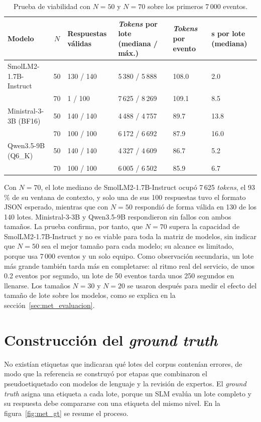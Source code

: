 \begin{table}[H]
\centering
\caption{Prueba de viabilidad con $N = 50$ y $N = 70$ sobre los primeros 7\,000 eventos.}
\label{tab:met_n70}
\small
\begin{tabular}{@{}p{3.3cm}cp{1.8cm}p{2.6cm}p{1.6cm}p{1.6cm}@{}}
\toprule
\textbf{Modelo} & $N$ & \textbf{Respuestas válidas} & \textbf{\textit{Tokens} por lote (mediana / máx.)} & \textbf{\textit{Tokens} por evento} & \textbf{s por lote (mediana)} \\
\midrule
SmolLM2-1.7B-Instruct & 50 & 130 / 140 & 5\,380 / 5\,888 & 108.0 & 2.0 \\
 & 70 & 1 / 100 & 7\,625 / 8\,269 & 109.1 & 8.5 \\
Ministral-3-3B (BF16) & 50 & 140 / 140 & 4\,488 / 4\,757 & 89.7 & 13.8 \\
 & 70 & 100 / 100 & 6\,172 / 6\,692 & 87.9 & 16.0 \\
Qwen3.5-9B (Q6\_K) & 50 & 140 / 140 & 4\,327 / 4\,609 & 86.7 & 5.2 \\
 & 70 & 100 / 100 & 6\,005 / 6\,502 & 85.9 & 6.7 \\
\bottomrule
\end{tabular}
\normalsize
\end{table}

Con $N = 70$, el lote mediano de SmolLM2-1.7B-Instruct ocupó 7\,625 \textit{tokens}, el 93\,\% de su ventana de contexto, y solo una de sus 100 respuestas tuvo el formato JSON esperado, mientras que con $N = 50$ respondió de forma válida en 130 de los 140 lotes. Ministral-3-3B y Qwen3.5-9B respondieron sin fallos con ambos tamaños. La prueba confirma, por tanto, que $N = 70$ supera la capacidad de SmolLM2-1.7B-Instruct y no es viable para toda la matriz de modelos, sin indicar que $N = 50$ sea el mejor tamaño para cada modelo; su alcance es limitado, porque usa 7\,000 eventos y un solo equipo. Como observación secundaria, un lote más grande también tarda más en completarse: al ritmo real del servicio, de unos 0.2 eventos por segundo, un lote de 50 eventos tarda unos 250 segundos en llenarse. Los tamaños $N = 30$ y $N = 20$ se usaron después para medir el efecto del tamaño de lote sobre los modelos, como se explica en la sección~\ref{sec:met_evaluacion}.

\section{Construcción del \textit{ground truth}}\label{sec:met_gt}

No existían etiquetas que indicaran qué lotes del corpus contenían errores, de modo que la referencia se construyó por etapas que combinaron el pseudoetiquetado con modelos de lenguaje y la revisión de expertos. El \textit{ground truth} asigna una etiqueta a cada lote, porque un SLM evalúa un lote completo y su respuesta debe compararse con una etiqueta del mismo nivel. En la figura~\ref{fig:met_gt} se resume el proceso.

